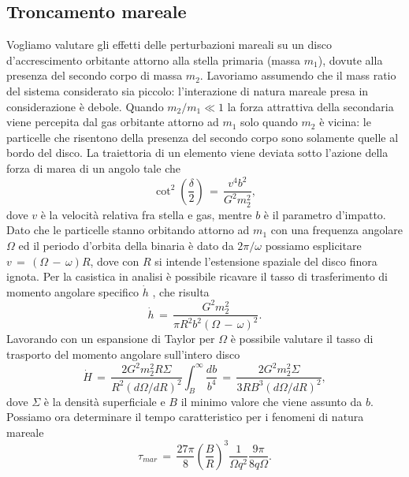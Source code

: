\subsection{Troncamento mareale}

Vogliamo valutare gli effetti delle perturbazioni mareali su un disco d'accrescimento orbitante attorno alla stella primaria (massa $m_1$), dovute alla presenza del secondo corpo di massa $m_2$.
Lavoriamo assumendo che il mass ratio del sistema considerato sia piccolo: l'interazione di natura mareale presa in considerazione è debole.
Quando $m_2/m_1 \ll 1$ la forza attrattiva della secondaria viene percepita dal gas orbitante attorno ad $m_1$ solo quando $m_2$ è vicina: le particelle che risentono della presenza del secondo corpo sono solamente quelle al bordo del disco.
La traiettoria di un elemento viene deviata sotto l'azione della forza di marea di un angolo tale che 
\begin{equation}
\cot^2{\left(\frac{\delta}{2}\right)}\,=\,\frac{v^4b^2}{G^2m_2^2},
\label{eq:picc_ang}
\end{equation}
dove $v$ è la velocità relativa fra stella e gas, mentre $b$ è il parametro d'impatto. Dato che le particelle stanno orbitando attorno ad $m_1$ con una frequenza angolare $\Omega$ ed il periodo d'orbita della binaria è dato da $2\pi/\omega$ possiamo esplicitare $v\,=\,(\Omega\,-\,\omega)R$, dove con $R$ si intende l'estensione spaziale del disco finora ignota.
Per la casistica in analisi è possibile ricavare il tasso di trasferimento di momento angolare specifico $\dot{h}$ \parencite{LinPapaloizou1979}, che risulta
\begin{equation}
\dot{h}\,=\,\frac{G^2m_2^2}{\pi R^2 b^2 (\Omega\,-\,\omega)^2}.
\label{eq:rate_moma}
\end{equation}
Lavorando con un espansione di Taylor per $\Omega$ è possibile valutare il tasso di trasporto del momento angolare sull'intero disco
\begin{equation}
\dot{H}\,=\,\frac{2G^2m_2^2R\Sigma}{R^2(d\Omega/dR)^2}\int_B^\infty \frac{db}{b^4}\,=\,\frac{2G^2m_2^2\Sigma}{3RB^3(d\Omega/dR)^2},
\label{eq:rate_moma_alldisc}
\end{equation}
dove $\Sigma$ è la densità superficiale e $B$ il minimo valore che viene assunto da $b$. Possiamo ora determinare il tempo caratteristico per i fenomeni di natura mareale
\begin{equation}
\tau_{mar}\,=\,\frac{27\pi}{8}\left(\frac{B}{R}\right)^3\frac{1}{\Omega q^2}\frac{9\pi}{8q\Omega}.
\label{eq:t_mareale}
\end{equation}

